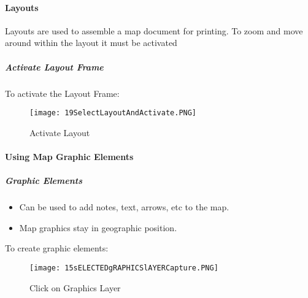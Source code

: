 \clearpage

\paragraph{Layouts}
Layouts are used to assemble a map document for printing.  To zoom and move around within the layout it must be activated

\subparagraph{Activate Layout Frame}

To activate the Layout Frame:

\vspace{.25in}



\begin{figure}[h!]
 \centering
     \texttt{[image: 19SelectLayoutAndActivate.PNG]}
 \caption{Activate Layout}


 \end{figure}  


\vspace{.25in}



\clearpage

\paragraph{Using Map Graphic Elements}

\subparagraph{Graphic Elements} 

\begin{itemize}

\item Can be used to add notes, text, arrows, etc to the map.  

\item Map graphics stay in geographic position.

\end{itemize}

\noindent To create graphic elements:


\begin{figure}[h!]
 \centering
     \texttt{[image: 15sELECTEDgRAPHICSlAYERCapture.PNG]}
 \caption{Click on Graphics Layer}

 \end{figure} 


